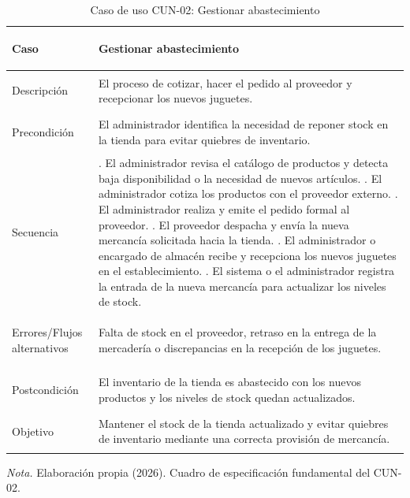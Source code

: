 \begin{table}[H]
  \centering
  \caption{Caso de uso CUN-02: Gestionar abastecimiento}
  \label{tab:cun_02}
  {\small
  \setlength{\tabcolsep}{4pt}
  \renewcommand{\arraystretch}{1.05}
  \begin{tabularx}{\textwidth}{|>{\bfseries\raggedright\arraybackslash}p{3.2cm}|>{\raggedright\arraybackslash}X|}
    \hline
    Caso & Gestionar abastecimiento \\
    \hline
    Descripción & El proceso de cotizar, hacer el pedido al proveedor y recepcionar los nuevos juguetes. \\
    \hline
    Precondición & El administrador identifica la necesidad de reponer stock en la tienda para evitar quiebres de inventario. \\
    \hline
    Secuencia &
    1. El administrador revisa el catálogo de productos y detecta baja disponibilidad o la necesidad de nuevos artículos. \newline
    2. El administrador cotiza los productos con el proveedor externo. \newline
    3. El administrador realiza y emite el pedido formal al proveedor. \newline
    4. El proveedor despacha y envía la nueva mercancía solicitada hacia la tienda. \newline
    5. El administrador o encargado de almacén recibe y recepciona los nuevos juguetes en el establecimiento. \newline
    6. El sistema o el administrador registra la entrada de la nueva mercancía para actualizar los niveles de stock. \\
    \hline
    Errores/Flujos alternativos & Falta de stock en el proveedor, retraso en la entrega de la mercadería o discrepancias en la recepción de los juguetes. \\
    \hline
    Postcondición & El inventario de la tienda es abastecido con los nuevos productos y los niveles de stock quedan actualizados. \\
    \hline
    Objetivo & Mantener el stock de la tienda actualizado y evitar quiebres de inventario mediante una correcta provisión de mercancía. \\
    \hline
  \end{tabularx}}
  \par\vspace{0.2ex}
  \raggedright\noindent\small \emph{Nota.} Elaboración propia (2026). Cuadro de especificación fundamental del CUN-02.
\end{table}


